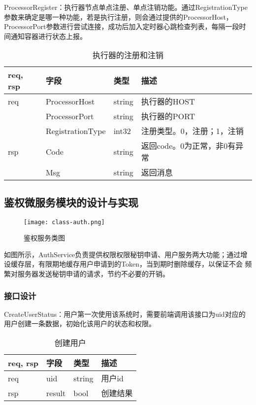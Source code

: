 ProcessorRegister：执行器节点单点注册、单点注销功能。通过RegistrationType参数来确定是哪一种功能，若是执行注册，则会通过提供的ProcessorHost，
ProcessorPort参数进行尝试连接，成功后加入定时器心跳检查列表，每隔一段时间通知容器进行状态上报。
    \begin{table}[H]
        \centering
        \caption{执行器的注册和注销}
        \label{tab:design-interface-processor-register}
        \begin{tabular}{llll}
            \toprule
            req, rsp   & 字段 & 类型 & 描述 \\
            \midrule
            req & ProcessorHost & string & 执行器的HOST\\
            & ProcessorPort & string & 执行器的PORT\\
            & RegistrationType & int32 & 注册类型。0，注册；1，注销 \\ \hline
            rsp & Code & string & 返回code。0为正常，非0有异常\\
            & Msg & string & 返回消息\\
            \bottomrule
        \end{tabular}
    \end{table}




\subsection{鉴权微服务模块的设计与实现}


    \begin{figure}[H]
        \centering
        \texttt{[image: class-auth.png]}
        \caption{鉴权服务类图}
        \label{fig:jqfw}
    \end{figure}

    如图所示，AuthService负责提供权限权限秘钥申请、用户服务两大功能；通过增设缓存层，有限期地缓存用户申请到的Token，当到期时删除缓存，以保证不会
    频繁对服务器发送秘钥申请的请求，节约不必要的开销。

\subsubsection{接口设计}
CreateUserStatus：用户第一次使用该系统时，需要前端调用该接口为uid对应的用户创建一条数据，初始化该用户的状态和权限。
\begin{table}[H]
    \centering
    \caption{创建用户}
    \label{tab:design-interface-user-create}
    \begin{tabular}{llll}
        \toprule
        req, rsp   & 字段 & 类型 & 描述 \\
        \midrule
        req & uid & string & 用户id\\ \hline
        rsp & result & bool & 创建结果\\
        \bottomrule
    \end{tabular}
\end{table}

